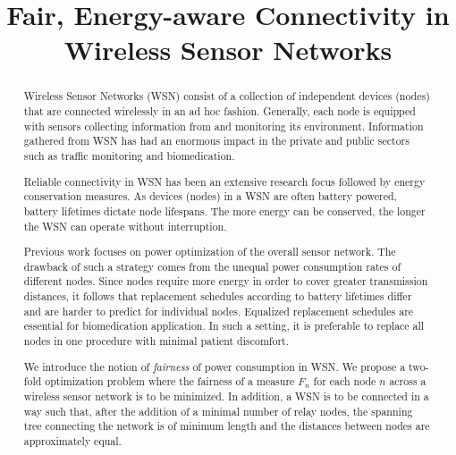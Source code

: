 \documentclass[conference]{IEEEtran}
\begin{document}
\title{Fair, Energy-aware Connectivity in Wireless Sensor Networks}
\author{
\and
{}
\and
{}
}
\maketitle

\begin{abstract}
Wireless Sensor Networks (WSN) consist of a collection of independent devices (nodes) that are connected wirelessly in an ad hoc fashion. Generally, each node is equipped with sensors collecting information from and monitoring its environment. Information gathered from WSN has had an enormous impact in the private and public sectors such as traffic monitoring and biomedication.

Reliable connectivity in WSN has been an extensive research focus followed by energy conservation measures. As devices (nodes) in a WSN are often battery powered, battery lifetimes dictate node lifespans. The more energy can be conserved, the longer the WSN can operate without interruption.

Previous work focuses on power optimization of the overall sensor network. The drawback of such a strategy comes from the unequal power consumption rates of different nodes. Since nodes require more energy in order to cover greater transmission distances, it follows that replacement schedules according to battery lifetimes differ and are harder to predict for individual nodes. Equalized replacement schedules are essential for biomedication application. In such a setting, it is preferable to replace all nodes in one procedure with minimal patient discomfort.

We introduce the notion of \textit{fairness} of power consumption in WSN. We propose a two-fold optimization problem where the fairness of a measure $F_n$ for each node $n$ across a wireless sensor network is to be minimized. In addition, a WSN is to be connected in a way such that, after the addition of a minimal number of relay nodes, the spanning tree connecting the network is of minimum length and the distances between nodes are approximately equal.
\end{abstract}
\end{document}
